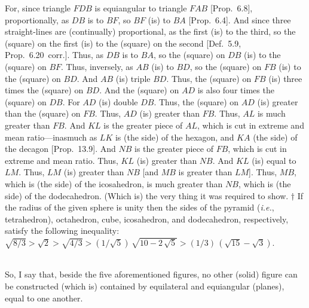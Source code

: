 For, since triangle $FDB$ is equiangular to triangle $FAB$ [Prop.~6.8],
proportionally, as $DB$ is to $BF$, so $BF$ (is) to $BA$ [Prop.~6.4]. 
And since three straight-lines are (continually) proportional, as the
first (is) to the third, so the (square) on the first (is) to the (square) on the
second [Def.~5.9, Prop.~6.20~corr.]. Thus, as $DB$ is to $BA$, so the (square) on $DB$
(is) to the (square) on $BF$. Thus, inversely, as $AB$ (is) to $BD$, so the
(square) on $FB$ (is) to the (square) on $BD$. And $AB$ (is) triple
$BD$. Thus, the (square) on $FB$ (is) three times the (square)
on $BD$. And the (square) on $AD$ is also four times the (square)
on $DB$. For $AD$ (is) double $DB$. Thus, the (square) on $AD$
(is) greater than the (square) on $FB$.  Thus, $AD$ (is) greater than
$FB$. 
Thus, $AL$ is much greater than $FB$. And $KL$ is the greater piece of $AL$, which is cut in extreme and
mean ratio---inasmuch as $LK$ is (the side) of the hexagon, and $KA$
(the side) of the decagon [Prop.~13.9]. And $NB$
is the greater piece of $FB$, which is cut in extreme and mean ratio. 
Thus, $KL$ (is) greater than $NB$.  And $KL$ (is) equal to $LM$. 
Thus, $LM$ (is) greater than $NB$ [and $MB$ is greater than $LM$].
Thus, $MB$, which is (the side) of the icosahedron, is much greater
than $NB$, which is (the side) of the dodecahedron.  (Which is)
the very thing it was required to show.
{\footnotesize\noindent$\dag$ If the radius of the given sphere is unity 
then the sides of the pyramid ({\em i.e.}, tetrahedron), octahedron, cube,
icosahedron, and dodecahedron, respectively, satisfy the following
inequality: $\sqrt{8/3} > \sqrt{2}>\sqrt{4/3}>(1/\sqrt{5})\,\sqrt{10 -2\,\sqrt{5}}
> (1/3)\,(\sqrt{15}-\sqrt{3})$.}

~\\

So, I say that, beside the five aforementioned  figures,  no other (solid) figure
can be constructed (which is) contained by equilateral and equiangular (planes), equal to one another.

